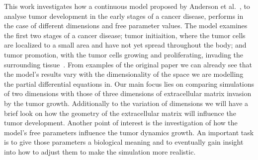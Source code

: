 This work investigates how a continuous model proposed by Anderson et al.~\cite{anderson_continuous_1998,anderson_mathematical_2000}, to analyse tumor development in the early stages of a cancer disease, performs in the case of different dimensions and free parameter values. The model examines the first two stages of a cancer disease; tumor initiaition, where the tumor cells are localized to a small area and have not yet spread throughout the body; and tumor promotion, with the tumor cells growing and proliferating, invading the surrounding tissue~\cite{10.1158/2159-8290.CD-21-1059}. From examples of the original paper we can already see that the model's results vary with the dimensionality of the space we are modelling the partial differential equations in. Our main focus lies on comparing simulations of two dimensions with those of three dimensions of extracellular matrix invasion by the tumor growth. Additionally to the variation of dimensions we will have a brief look on how the geometry of the extracellular matrix will influence the tumor development. \newline 
Another point of interest is the investigation of how the model's free parameters influence the tumor dynamics growth. An important task is to give those parameters a biological meaning and to eventually gain insight into how to adjust them to make the simulation more realistic.